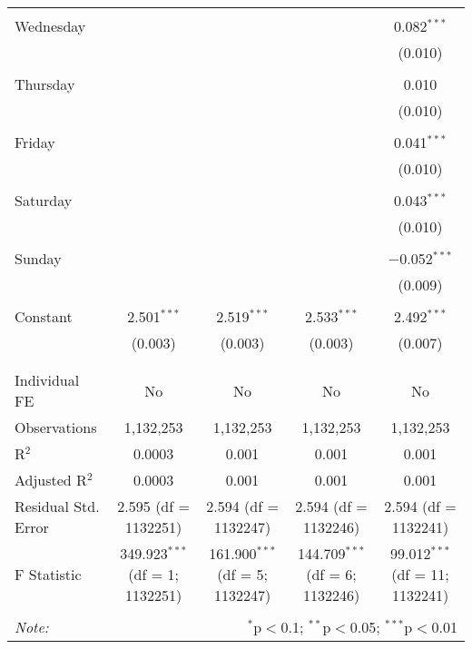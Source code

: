 \documentclass[
]{article}
\begin{document}
\begin{table}[!htbp]
{\begin{tabular}{@{\extracolsep{5pt}}lcccc}
  & & & & \\ 
 Wednesday &  &  &  & 0.082$^{***}$ \\ 
  &  &  &  & (0.010) \\ 
  & & & & \\ 
 Thursday &  &  &  & 0.010 \\ 
  &  &  &  & (0.010) \\ 
  & & & & \\ 
 Friday &  &  &  & 0.041$^{***}$ \\ 
  &  &  &  & (0.010) \\ 
  & & & & \\ 
 Saturday &  &  &  & 0.043$^{***}$ \\ 
  &  &  &  & (0.010) \\ 
  & & & & \\ 
 Sunday &  &  &  & $-$0.052$^{***}$ \\ 
  &  &  &  & (0.009) \\ 
  & & & & \\ 
 Constant & 2.501$^{***}$ & 2.519$^{***}$ & 2.533$^{***}$ & 2.492$^{***}$ \\ 
  & (0.003) & (0.003) & (0.003) & (0.007) \\ 
  & & & & \\ 
\hline \\[-1.8ex] 
Individual FE & No & No & No & No \\ 
Observations & 1,132,253 & 1,132,253 & 1,132,253 & 1,132,253 \\ 
R$^{2}$ & 0.0003 & 0.001 & 0.001 & 0.001 \\ 
Adjusted R$^{2}$ & 0.0003 & 0.001 & 0.001 & 0.001 \\ 
Residual Std. Error & 2.595 (df = 1132251) & 2.594 (df = 1132247) & 2.594 (df = 1132246) & 2.594 (df = 1132241) \\ 
F Statistic & 349.923$^{***}$ (df = 1; 1132251) & 161.900$^{***}$ (df = 5; 1132247) & 144.709$^{***}$ (df = 6; 1132246) & 99.012$^{***}$ (df = 11; 1132241) \\ 
\hline 
\hline \\[-1.8ex] 
\textit{Note:}  & \multicolumn{4}{r}{$^{*}$p$<$0.1; $^{**}$p$<$0.05; $^{***}$p$<$0.01} \\ 
\end{tabular}
} 
\end{table} 
\newpage
\end{document}
